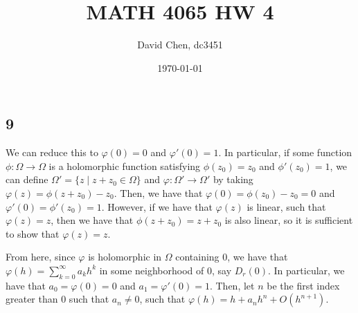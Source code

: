 \documentclass[12pt,letterpaper]{article}
\title{MATH 4065 HW 4}
\author{David Chen, dc3451}
\date{\today}
\theoremstyle{definition}
\begin{document}
\maketitle

\subsection*{9}

We can reduce this to $\varphi(0) = 0$ and $\varphi'(0) = 1$. In particular, if some function $\phi: \Omega \rightarrow \Omega$ is a holomorphic function satisfying $\phi(z_{0}) = z_{0}$ and $\phi'(z_{0}) = 1$, we can define $\Omega' = \{z \mid z + z_{0} \in \Omega\}$ and $\varphi: \Omega' \rightarrow \Omega'$ by taking $\varphi(z) = \phi(z + z_{0}) - z_{0}$. Then, we have that $\varphi(0) = \phi(z_{0}) - z_{0} = 0$ and $\varphi'(0) = \phi'(z_{0}) = 1$. However, if we have that $\varphi(z)$ is linear, such that $\varphi(z) = z$, then we have that $\phi(z + z_{0}) = z + z_{0}$ is also linear, so it is sufficient to show that $\varphi(z) = z$.

From here, since $\varphi$ is holomorphic in $\Omega$ containing $0$, we have that $\varphi(h) = \sum_{k=0}^{\infty}a_{k}h^{k}$ in some neighborhood of $0$, say $D_{r}(0)$. In particular, we have that $a_{0} = \varphi(0) = 0$ and $a_{1} = \varphi'(0) = 1$. Then, let $n$ be the first index greater than $0$ such that $a_{n} \neq 0$, such that $\varphi(h) = h + a_{n}h^{n} + O(h^{n+1})$.
\end{document}
